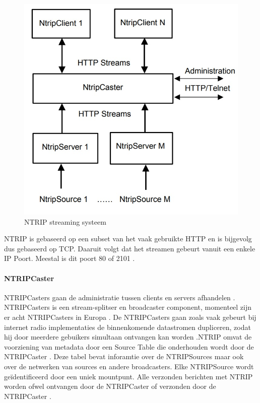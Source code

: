 \begin{figure}[hpb]
	\includegraphics[scale=0.55]{NTRIP.jpg}
	\caption{NTRIP streaming systeem \cite{LBibNTRIP}}
	\label{imgNTRIP}
\end{figure} 
NTRIP is gebaseerd op een subset van het vaak gebruikte HTTP en is bijgevolg dus gebaseerd op TCP. Daaruit volgt dat het streamen gebeurt vanuit een enkele IP Poort. Meestal is dit poort 80 of 2101 \cite{LBibNTRIP3}. 

\paragraph{NTRIPCaster}
 NTRIPCasters gaan de administratie tussen clients en servers afhandelen \cite{LBibGPS}. NTRIPCasters is een stream-splitser en broadcaster component, momenteel zijn er acht NTRIPCasters in Europa \cite{LBibNTRIP}. De NTRIPCasters gaan zoals vaak gebeurt bij internet radio implementaties de binnenkomende datastromen dupliceren, zodat hij door meerdere gebuikers simultaan ontvangen kan worden \cite{LBibNTRIP2}.NTRIP omvat de voorziening van metadata door een Source Table die onderhouden wordt door de NTRIPCaster \cite{LBibNTRIP3}. Deze tabel bevat inforamtie over de NTRIPSources maar ook over de netwerken van sources en andere broadcasters. Elke NTRIPSource wordt ge\"identificeerd door een uniek mountpunt. Alle verzonden berichten met NTRIP worden ofwel ontvangen door de NTRIPCaster of verzonden door de NTRIPCaster \cite{LBibNTRIP4}.
 
